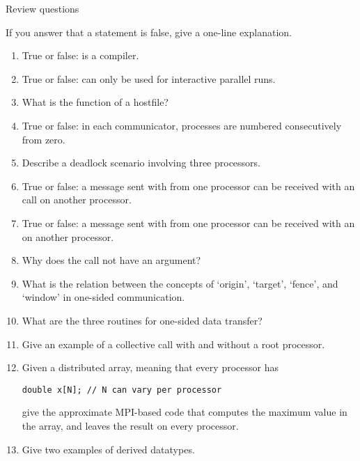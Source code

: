  {Review questions}

If you answer that a statement is false, give a one-line explanation.
\begin{enumerate}

\item True or false:  is a compiler.

\item True or false:  can only be used for interactive parallel runs.

\item What is the function of a hostfile?

\item True or false: in each communicator, processes are numbered consecutively from zero.

\item Describe a deadlock scenario involving three processors.

\item True or false: a message sent with  from one processor can be
  received with an  call on another processor.

\item True or false: a message sent with  from one processor can be
  received with an  on another processor.

\item Why does the  call not have an  argument?

\item What is the relation between the concepts of `origin', `target', `fence',
  and `window' in one-sided communication.

\item What are the three routines for one-sided data transfer?

\item Give an example of a collective call with and without a root processor.

\item Given a distributed array, meaning that every processor has
\begin{verbatim}
double x[N]; // N can vary per processor
\end{verbatim}
give the approximate MPI-based code that computes the maximum value
in the array, and leaves the result on every processor.

\item Give two examples of derived datatypes.


\end{enumerate}
